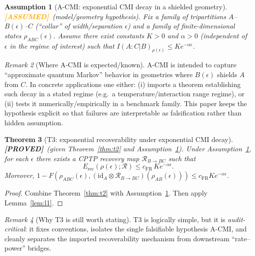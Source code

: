 \documentclass[11pt]{article}
\newtheorem{theorem}{Theorem}[section]
\newtheorem{assumption}[theorem]{Assumption}
\theoremstyle{definition}
\theoremstyle{remark}
\newtheorem{remark}[theorem]{Remark}
\newcommand{\ASSUMED}{\textcolor{orange}{\textbf{[ASSUMED]}}}
\newcommand{\PROVED}{\textcolor{green!60!black}{\textbf{[PROVED]}}}
\newcommand{\Erec}{E_{\mathrm{rec}}}
\begin{document}
\begin{assumption}[A-CMI: exponential CMI decay in a shielded geometry]
\label{ass:acmi}
\ASSUMED\ (model/geometry hypothesis). Fix a family of tripartitions
$A$--$B(\epsilon)$--$C$ (``collar'' of width/separation $\epsilon$) and
a family of finite-dimensional states $\rho_{ABC}(\epsilon)$. Assume
there exist constants $K > 0$ and $\alpha > 0$ (independent of
$\epsilon$ in the regime of interest) such that
$I(A : C | B)_{\rho(\epsilon)} \le K e^{-\alpha\epsilon}$.
\end{assumption}

\begin{remark}[Where A-CMI is expected/known]
\label{rem:acmiwhere}
A-CMI is intended to capture ``approximate quantum Markov'' behavior in
geometries where $B(\epsilon)$ shields $A$ from $C$. In concrete
applications one either: (i) imports a theorem establishing such decay
in a stated regime (e.g.\ a temperature/interaction range regime), or
(ii) tests it numerically/empirically in a benchmark family. This paper
keeps the hypothesis explicit so that failures are interpretable as
falsification rather than hidden assumption.
\end{remark}

\begin{theorem}[T3: exponential recoverability under exponential CMI
decay]
\label{thm:t3}
\PROVED\ (given Theorem~\ref{thm:t2} and Assumption~\ref{ass:acmi}).
Under Assumption~\ref{ass:acmi}, for each $\epsilon$ there exists a CPTP
recovery map $\mathcal{R}_{B\to BC}$ such that
\[
\Erec(\rho(\epsilon); \mathcal{R}) \le c_{\mathrm{FR}}\, K
e^{-\alpha\epsilon}.
\]
Moreover, $1 - F(\rho_{ABC}(\epsilon), (\mathrm{id}_A \otimes
\mathcal{R}_{B\to BC})(\rho_{AB}(\epsilon))) \le c_{\mathrm{FR}} K
e^{-\alpha\epsilon}$.
\end{theorem}

\begin{proof}
Combine Theorem~\ref{thm:t2} with Assumption~\ref{ass:acmi}. Then apply
Lemma~\ref{lem:l1}.
\end{proof}

\begin{remark}[Why T3 is still worth stating]
\label{rem:whyt3}
T3 is logically simple, but it is \emph{audit-critical}: it fixes
conventions, isolates the single falsifiable hypothesis A-CMI, and
cleanly separates the imported recoverability mechanism from downstream
``rate--power'' bridges.
\end{remark}
\end{document}
